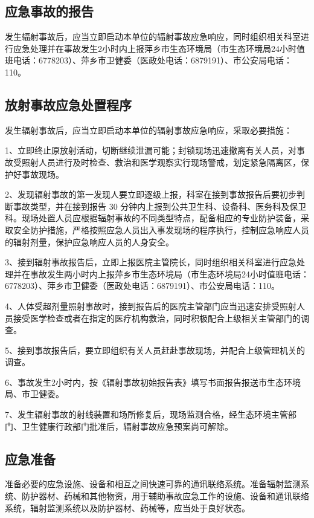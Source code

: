 \subsection{应急事故的报告}

发生辐射事故后，应当立即启动本单位的辐射事故应急响应，同时组织相关科室进行应急处理并在事故发生2小时内上报萍乡市生态环境局（市生态环境局24小时值班电话：6778203）、萍乡市卫健委（医政处电话：6879191）、市公安局电话：110。

\subsection{放射事故应急处置程序}

发生辐射事故后，应当立即启动本单位的辐射事故应急响应，采取必要措施：

1、立即终止原放射活动，切断继续泄漏可能；封锁现场迅速撤离有关人员，对事故受照射人员进行及时检查、救治和医学观察实行现场警戒，划定紧急隔离区，保护好事故现场。

2、发现辐射事故的第一发现人要立即逐级上报，科室在接到事故报告后要初步判断事故类型，并在接到报告 30 分钟内上报到公共卫生科、设备科、医务科及保卫科。现场处置人员应根据辐射事故的不同类型特点，配备相应的专业防护装备，采取安全防护措施，严格按照应急人员出入事发现场的程序执行，控制应急响应人员的辐射剂量，保护应急响应人员的人身安全。

3、接到辐射事故报告后，立即上报医院主管院长，同时组织相关科室进行应急处理并在事故发生两小时内上报萍乡市生态环境局（市生态环境局24小时值班电话：6778203）、萍乡市卫健委（医政处电话：6879191）、市公安局电话：110。

4、人体受超剂量照射事故时，接到报告后的医院主管部门应当迅速安排受照射人员接受医学检查或者在指定的医疗机构救治，同时积极配合上级相关主管部门的调查。

5、接到事故报告后，要立即组织有关人员赶赴事故现场，并配合上级管理机关的调查。

6、事故发生2小时内，按《辐射事故初始报告表》填写书面报告报送市生态环境局、市卫健委。

7、发生辐射事故的射线装置和场所修复后，现场监测合格，经生态环境主管部门、卫生健康行政部门批准后，辐射事故应急预案尚可解除。

\subsection{应急准备}

准备必要的应急设施、设备和相互之间快速可靠的通讯联络系统。准备辐射监测系统、防护器材、药械和其他物资，用于辅助事故应急工作的设施、设备和通讯联络系统，辐射监测系统以及防护器材、药械等，应当处于良好状态。

